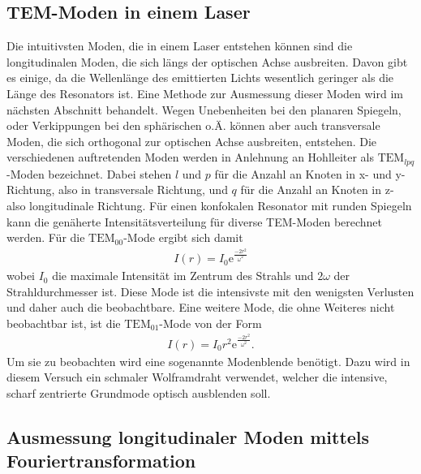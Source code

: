 \subsection{TEM-Moden in einem Laser}

Die intuitivsten Moden, die in einem Laser entstehen können sind die longitudinalen
Moden, die sich längs der optischen Achse ausbreiten. Davon gibt es einige, da die
Wellenlänge des emittierten Lichts wesentlich geringer als die Länge des Resonators ist.
Eine Methode zur Ausmessung dieser Moden wird im nächsten Abschnitt behandelt.
Wegen Unebenheiten bei den planaren Spiegeln, oder Verkippungen bei den sphärischen o.Ä.
können aber auch transversale Moden, die sich orthogonal zur optischen Achse ausbreiten, entstehen.
Die verschiedenen auftretenden Moden werden in Anlehnung an Hohlleiter als $\text{TEM}_{lpq}$-Moden
bezeichnet. Dabei stehen $l$ und $p$ für die Anzahl an Knoten in x- und y-Richtung, also
in transversale Richtung, und $q$ für die Anzahl an Knoten in z- also longitudinale
Richtung. Für einen konfokalen Resonator mit runden Spiegeln kann die genäherte Intensitätsverteilung
für diverse TEM-Moden berechnet werden. Für die $\text{TEM}_{00}$-Mode ergibt sich damit
\begin{align}
  I(r) = I_0 \mathrm{e}^{\frac{-2 r^2}{\omega^2}}
\end{align}
wobei $I_0$ die maximale Intensität im Zentrum des Strahls und $2 \omega$ der Strahldurchmesser ist.
Diese Mode ist die intensivste mit den wenigsten Verlusten und daher auch die beobachtbare.
Eine weitere Mode, die ohne Weiteres nicht beobachtbar ist, ist die $\text{TEM}_{01}$-Mode von der Form
\begin{align}
  I(r) = I_0 r^2 \mathrm{e}^{\frac{-2 r^2}{\omega^2}}.
\end{align}
Um sie zu beobachten wird eine sogenannte Modenblende benötigt. Dazu wird in diesem Versuch ein
schmaler Wolframdraht verwendet, welcher die intensive, scharf zentrierte Grundmode optisch ausblenden soll.

\subsection{Ausmessung longitudinaler Moden mittels Fouriertransformation}
\label{sec:long}

